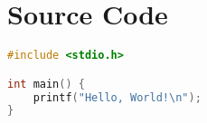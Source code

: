 \section{Source Code}
\label{appendix:source-code}

\begin{lstlisting}[language=c]
#include <stdio.h>

int main() {
	printf("Hello, World!\n");
}
\end{lstlisting}
